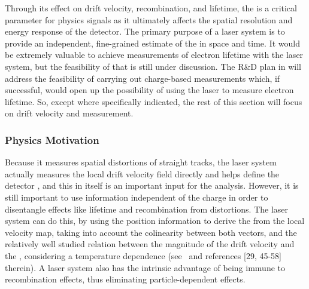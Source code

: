 
Through its effect on drift velocity, recombination, and lifetime, the \efield is a critical parameter for physics signals as it ultimately affects the spatial resolution and energy response of the detector. The primary purpose of a laser system is to provide an independent, fine-grained estimate of the \efield in space and time.
It would be extremely valuable to achieve measurements of electron lifetime with the laser system, but the feasibility of that is still under discussion. %
The R\&D plan in  will address the feasibility of carrying out charge-based measurements which, if successful, would open up the possibility of using the laser to measure electron lifetime. So, except where specifically indicated, the rest of this section will focus on 
drift velocity and \efield measurement.

\subsubsection{Physics Motivation}
Because it measures spatial distortions of straight tracks, the laser system actually measures the local drift velocity field directly and helps define the detector , and this in itself is an important input for the  analysis. 
However, it is still important to use information independent of the charge in order to disentangle effects like lifetime and recombination from \efield distortions. The laser system can do this, by using the position information to derive the \efield from the local velocity map, taking into account the colinearity between both vectors, and the relatively well studied relation between the magnitude of the drift velocity and the \efield, considering a temperature dependence (see~\cite{Li:2015rqa} and references [29, 45-58] therein). A laser system also has the intrinsic advantage of being immune to recombination effects, thus eliminating particle-dependent effects.  

